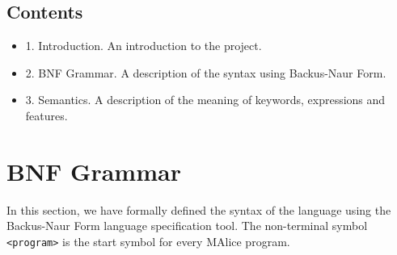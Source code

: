 \documentclass[a4wide, 10pt]{article}
\begin{document}
\subsection{Contents}
\begin{itemize}
\item 1. Introduction. An introduction to the project.
\item 2. BNF Grammar. A description of the syntax using Backus-Naur Form.
\item 3. Semantics. A description of the meaning of keywords, expressions and features.
\end{itemize}


\newpage

\section{BNF Grammar} 

In this section, we have formally defined the syntax of the language using the Backus-Naur Form language
specification tool. The non-terminal symbol \verb+<program>+ is the start symbol for every MAlice program. 
\end{document}
